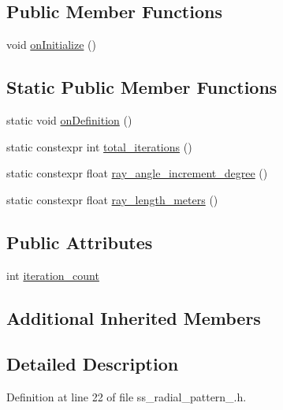 \subsection*{Public Member Functions}
\begin{DoxyCompactItemize}
\item 
void \hyperlink{structsm__dance__bot_1_1SS3_1_1SsRadialPattern3_aa1b5bd2fc0d0c33d3a1b32e9b1deac84}{on\+Initialize} ()
\end{DoxyCompactItemize}
\subsection*{Static Public Member Functions}
\begin{DoxyCompactItemize}
\item 
static void \hyperlink{structsm__dance__bot_1_1SS3_1_1SsRadialPattern3_a42649ec4550080c7ab3b95c3c60c4c1c}{on\+Definition} ()
\item 
static constexpr int \hyperlink{structsm__dance__bot_1_1SS3_1_1SsRadialPattern3_a131ebb64f66358e769217388cb2b05c5}{total\+\_\+iterations} ()
\item 
static constexpr float \hyperlink{structsm__dance__bot_1_1SS3_1_1SsRadialPattern3_a904170764306e3c9242b9cd66e44b56e}{ray\+\_\+angle\+\_\+increment\+\_\+degree} ()
\item 
static constexpr float \hyperlink{structsm__dance__bot_1_1SS3_1_1SsRadialPattern3_aa7fa90f5fd3694bad969f97d6fddd01e}{ray\+\_\+length\+\_\+meters} ()
\end{DoxyCompactItemize}
\subsection*{Public Attributes}
\begin{DoxyCompactItemize}
\item 
int \hyperlink{structsm__dance__bot_1_1SS3_1_1SsRadialPattern3_a62885be83defcafb3fe5237dd3ec6b4c}{iteration\+\_\+count}
\end{DoxyCompactItemize}
\subsection*{Additional Inherited Members}


\subsection{Detailed Description}


Definition at line 22 of file ss\+\_\+radial\+\_\+pattern\+\_.\+h.




